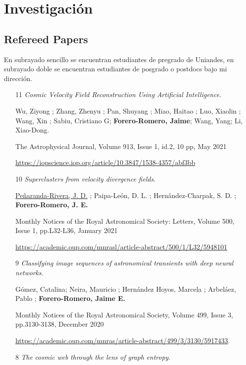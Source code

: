 \documentclass{article}
\begin{document}
\newpage
\section{Investigaci\'on}

\subsection{Refereed Papers}

En subrayado sencillo se encuentran estudiantes de pregrado de
Uniandes, en subrayado doble se encuentran estudiantes de posgrado o postdocs bajo mi direcci\'on.

\begin{itemize}

\item[11]{\it Cosmic Velocity Field Reconstruction Using Artificial Intelligence}. 

Wu, Ziyong ; Zhang, Zhenyu ; Pan, Shuyang ; Miao, Haitao ; Luo, Xiaolin ; Wang, Xin ; Sabiu, Cristiano G; \textbf{Forero-Romero, Jaime}; Wang, Yang; Li, Xiao-Dong.

The Astrophysical Journal, Volume 913, Issue 1, id.2, 10 pp, May 2021

\url{https://iopscience.iop.org/article/10.3847/1538-4357/abf3bb}

\item[10]{\it Superclusters from velocity divergence fields}.

\underline{Pe\~naranda-Rivera, J. D.} ; Paipa-León, D. L. ; Hernández-Charpak, S. D. ; \textbf{Forero-Romero, J. E.}

Monthly Notices of the Royal Astronomical Society: Letters, Volume 500, Issue 1, pp.L32-L36, January 2021

\url{https://academic.oup.com/mnrasl/article-abstract/500/1/L32/5948101}

\item[9]{\it Classifying image sequences of astronomical transients with deep neural networks}.

Gómez, Catalina; Neira, Mauricio ; Hernández Hoyos, Marcela ; Arbeláez, Pablo ; \textbf{Forero-Romero, Jaime E.}

Monthly Notices of the Royal Astronomical Society, Volume 499, Issue 3, pp.3130-3138, December 2020

\url{https://academic.oup.com/mnras/article-abstract/499/3/3130/5917433}.  

\item[8]{\it The cosmic web through the lens of graph entropy}.


\end{itemize}
\end{document}
